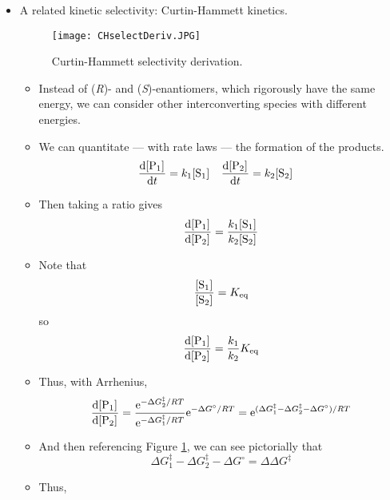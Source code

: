 \documentclass[../notes.tex]{subfiles}
\begin{document}
\begin{itemize}
    \item A related kinetic selectivity: Curtin-Hammett kinetics.
    \begin{figure}[h!]
        \centering
        \texttt{[image: CHselectDeriv.JPG]}
        \caption{Curtin-Hammett selectivity derivation.}
        \label{fig:CHselectDeriv}
    \end{figure}
    \begin{itemize}
        \item Instead of (\emph{R})- and (\emph{S})-enantiomers, which rigorously have the same energy, we can consider other interconverting species with different energies.
        \item We can quantitate --- with rate laws --- the formation of the products.
        \begin{align*}
            \dv{\cnc{P1}}{t} &= k_1\cnc{S1}&
            \dv{\cnc{P2}}{t} &= k_2\cnc{S2}
        \end{align*}
        \item Then taking a ratio gives
        \begin{equation*}
            \dv{\cnc{P1}}{\cnc{P2}} = \frac{k_1\cnc{S1}}{k_2\cnc{S2}}
        \end{equation*}
        \item Note that
        \begin{equation*}
            \frac{\cnc{S1}}{\cnc{S2}} = \Keq
        \end{equation*}
        so
        \begin{equation*}
            \dv{\cnc{P1}}{\cnc{P2}} = \frac{k_1}{k_2}\Keq
        \end{equation*}
        \item Thus, with Arrhenius,
        \begin{equation*}
            \dv{\cnc{P1}}{\cnc{P2}} = \frac{\e[-\Delta G^\ddagger_2/RT]}{\e[-\Delta G^\ddagger_1/RT]}\e[-\Delta G^\circ/RT]
            = \e[(\Delta G^\ddagger_1-\Delta G^\ddagger_2-\Delta G^\circ)/RT]
        \end{equation*}
        \item And then referencing Figure \ref{fig:CHselectDeriv}, we can see pictorially that
        \begin{equation*}
            \Delta G^\ddagger_1-\Delta G^\ddagger_2-\Delta G^\circ = \Delta\Delta G^\ddagger
        \end{equation*}
        \item Thus, 
        \begin{equation*}

\end{equation*}
\end{itemize}
\end{itemize}
\end{document}
